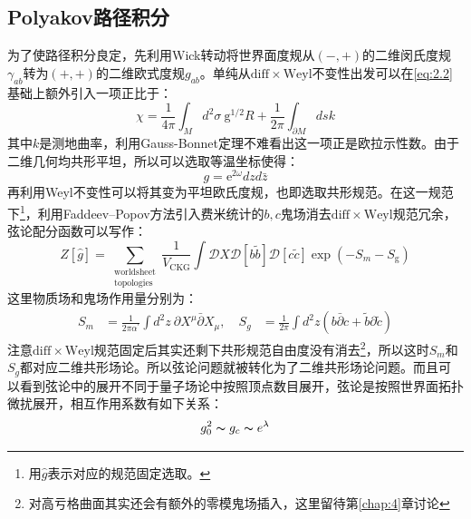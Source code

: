 \subsection{Polyakov路径积分}
为了使路径积分良定，先利用Wick转动将世界面度规从$(-,+)$的二维闵氏度规$\gamma_{ab}$转为$(+,+)$的二维欧式度规$g_{ab}$。单纯从$\mathrm{diff}\times\mathrm{Weyl}$不变性出发可以在\ref{eq:2.2}基础上额外引入一项正比于：
\begin{equation}
	\chi=\frac{1}{4\pi}\int_Md^2\sigma\mathrm{~g}^{1/2}R+\frac{1}{2\pi}\int_{\partial M}dsk
\end{equation}
其中$k$是测地曲率，利用Gauss-Bonnet定理不难看出这一项正是欧拉示性数。由于二维几何均共形平坦，所以可以选取等温坐标使得：
\begin{equation}
	\label{eq:2.30}
	g = \mathrm{e}^{2\omega} dz d\bar z
\end{equation}
再利用Weyl不变性可以将其变为平坦欧氏度规，也即选取共形规范。在这一规范下\footnote{用$\hat g$表示对应的规范固定选取。}，利用Faddeev–Popov方法引入费米统计的$b,c$鬼场消去$\mathrm{diff}\times\mathrm{Weyl}$规范冗余，弦论配分函数可以写作：
\begin{equation}
	\label{eq:2.31}
	Z\left[\hat{g}\right]=\sum_{\substack{\text{worldsheet}\\\text{topologies}}}\frac{1}{V_{\mathrm{CKG}}}\int\mathcal{D}X\mathcal{D}[b\tilde{b}]\mathcal{D}[c\tilde{c}]\exp(-S_m-S_\mathrm{g})
\end{equation}
这里物质场和鬼场作用量分别为：
\begin{equation}
	\label{eq:2.32}
	\begin{aligned}
		S_m&=\frac{1}{2\pi\alpha^{\prime}}\int d^2z\mathrm{~}\partial X^\mu\bar{\partial}X_\mu,\quad
		S_g&=\frac{1}{2\pi}\int d^2z\left(b\bar\partial c+\tilde b\partial \tilde c\right)
	\end{aligned}
\end{equation}
注意$\mathrm{diff}\times\mathrm{Weyl}$规范固定后其实还剩下共形规范自由度没有消去\footnote{对高亏格曲面其实还会有额外的零模鬼场插入，这里留待第\ref{chap:4}章讨论}，所以这时$S_m$和$S_g$都对应二维共形场论。所以弦论问题就被转化为了二维共形场论问题。而且可以看到弦论中的展开不同于量子场论中按照顶点数目展开，弦论是按照世界面拓扑微扰展开，相互作用系数有如下关系：
\begin{equation}
	g_0^2\thicksim g_c\thicksim e^\lambda
\end{equation}

